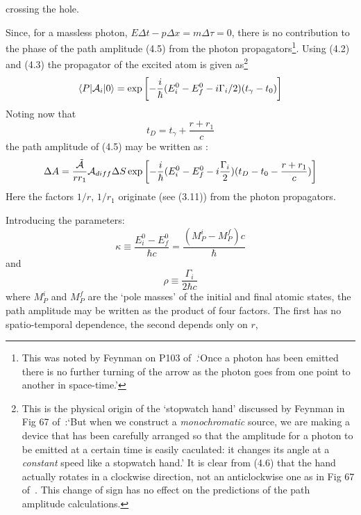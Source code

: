 \documentclass [12pt]{article}
\begin{document}
{  crossing the hole.
  \par Since, for a massless photon, $E\Delta t- p \Delta x = m \Delta \tau = 0$, there is no
  contribution to the phase of the path amplitude (4.5) from the photon propagators\footnote{
   This was noted by Feynman on P103 of~\cite{Feyn1}.`Once a photon has been emitted there is no
   further turning of the arrow as the photon goes from one point to another in space-time.'}. Using (4.2) and
  (4.3) the propagator of the excited atom is given as\footnote{This is the physical origin of the
  `stopwatch hand' discussed by Feynman in Fig 67 of~\cite{Feyn1}:`But when we construct a {\it monochromatic}
  source, we are making a device that has been carefully arranged so that the amplitude for a photon to
  be emitted at a certain time is easily caculated: it changes its angle at a {\it constant} speed like a
  stopwatch hand.' It is clear from (4.6) that the hand actually rotates in a clockwise direction, 
  not an anticlockwise one as in  Fig 67 of~\cite{Feyn1}. This change of sign has no effect on the
   predictions of the path amplitude calculations.}
  \begin{equation}
  \langle P|{\cal A}_i| 0 \rangle =  \exp\left[ -\frac{i}{\hbar}(E_i^0-E_f^0-i\Gamma_i/2)(t_{\gamma}-t_0)\right]
 \end{equation}
  Noting now that
   \begin{equation}
     t_D = t_{\gamma} + \frac{r+r_1}{c}
 \end{equation}
 the path amplitude of (4.5) may be written as :
  \begin{equation}
  \Delta A = \frac{\tilde{{\cal A}}}{r r_1} {\cal A}_{diff} \Delta S
   \exp\left[ -\frac{i}{\hbar}(E_i^0-E_f^0-i\frac{\Gamma_i}{2})(t_D-t_0- \frac{r+r_1}{c})\right]  
 \end{equation}
   Here the factors $1/r$, $1/r_1$ originate (see (3.11)) from the photon propagators. 
  \par Introducing the parameters:
    \begin{equation}
    \kappa \equiv \frac{E_i^0-E_f^0}{\hbar c} =  \frac{(M_P^i-M_P^f)c}{\hbar}
   \end{equation}
   and
  \begin{equation}
  \rho   \equiv \frac{\Gamma_i}{2\hbar c}
   \end{equation}
   where $M_P^i$ and $M_P^f$ are the `pole masses' of the initial and final
   atomic states, 
 the path amplitude may be written as the product of four factors. The first has no
  spatio-temporal dependence, the second depends only on $r$, 
}
\end{document}
